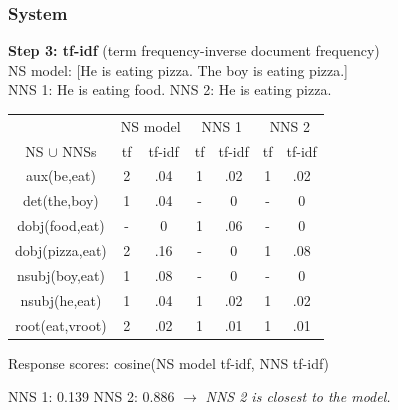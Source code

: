 \documentclass[xcolor={dvipsnames}]{beamer}
\begin{document}
\begin{frame}
\frametitle{System}
\small
\textbf{Step 3: tf-idf} (term frequency-inverse document frequency) \\
\vspace{.5em}
\pause
NS model: [He is eating pizza. The boy is eating pizza.] \\ 
\vspace{.5em}
\pause
NNS 1: He is eating food. \hspace{1.4em} \pause NNS 2: He is eating pizza. \\

\pause
\vspace{-.6em}
\footnotesize
\begin{table}[htb!]
\begin{center}
\begin{tabular}{|c||c|c||c|c||c|c|}
\hline
 & \multicolumn{2}{c||}{NS model} & \multicolumn{2}{c||}{NNS 1} & \multicolumn{2}{c|}{NNS 2} \\
\cline{2-7}
NS $\cup$ NNSs & tf & tf-idf & tf & tf-idf & tf & tf-idf \\
\hline
aux(be,eat) & 2 & .04 & 1  &  .02 &  1 & .02 \\ 
\hline
det(the,boy) & 1 & .04 &  -  & 0 & - & 0 \\
\hline
dobj(food,eat) & - & 0 & 1   & .06 & - & 0 \\
\hline
dobj(pizza,eat) & 2 & .16 & -   & 0 & 1 & .08 \\
\hline
nsubj(boy,eat) & 1 & .08 & -  & 0 & - & 0 \\
\hline
nsubj(he,eat) & 1 & .04 & 1   & .02 & 1 & .02 \\
\hline
root(eat,vroot) & 2 & .02 & 1   & .01 & 1 & .01 \\ %
\hline
\end{tabular}
\end{center}
\end{table}

\vspace{.5em}

\small
Response scores: cosine(NS model tf-idf, NNS tf-idf) \\
\vspace{.5em}

\pause
NNS 1: 0.139 \hspace{.6em} \pause NNS 2: 0.886 \pause \hspace{.6em} $\rightarrow$ \hspace{.6em} \textit{NNS 2 is closest to the model.} \\

\end{frame}
\end{document}
